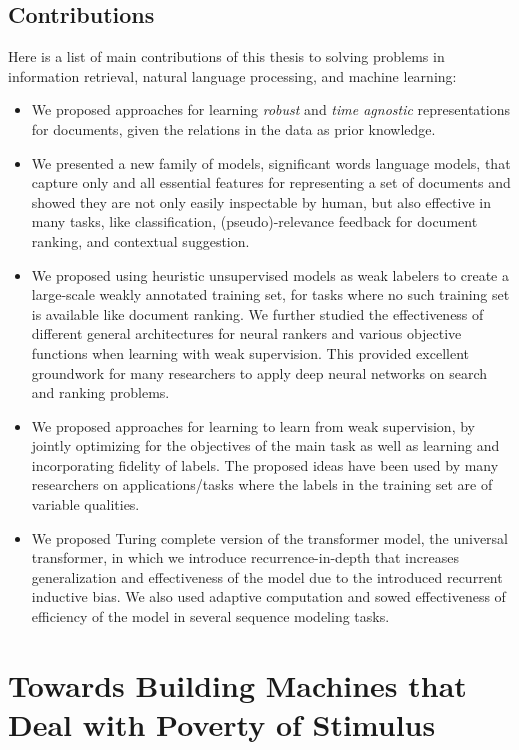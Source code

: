 \subsection{Contributions}
Here is a list of main contributions of this thesis to solving problems in information retrieval, natural language processing, and machine learning:
\begin{itemize}
    \item We proposed approaches for learning \emph{robust} and \emph{time agnostic} representations for documents, given the relations in the data as prior knowledge.
    \item We presented a new family of models, significant words language models, that capture only and all essential features for representing a set of documents and showed they are not only easily inspectable by human, but also effective in many tasks, like classification, (pseudo)-relevance feedback for document ranking, and contextual suggestion. 
    \item We proposed using heuristic unsupervised models as weak labelers to create a large-scale weakly annotated training set, for tasks where no such training set is available like document ranking. We further studied the effectiveness of different general architectures for neural rankers and various objective functions when learning with weak supervision. This provided excellent groundwork for many researchers to apply deep neural networks on search and ranking problems.
    \item We proposed approaches for learning to learn from weak supervision, by jointly optimizing for the objectives of the main task as well as learning and incorporating fidelity of labels. The proposed ideas have been used by many researchers on applications/tasks where the labels in the training set are of variable qualities.  
    \item We proposed Turing complete version of the transformer model, the universal transformer, in which we introduce recurrence-in-depth that increases generalization and effectiveness of the model due to the introduced recurrent inductive bias. We also used adaptive computation and sowed effectiveness of efficiency of the model in several sequence modeling tasks. 
\end{itemize}


\section{Towards Building Machines that Deal with Poverty of Stimulus}

